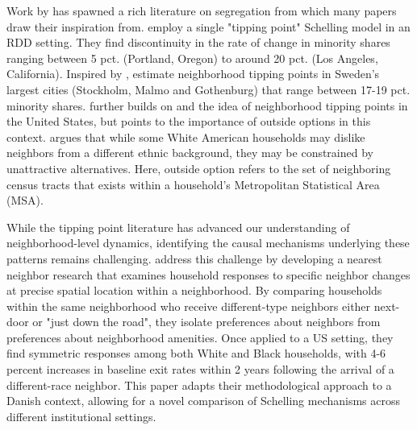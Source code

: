 \documentclass[../main.tex]{subfiles}
\begin{document}
Work by \textcite{schelling1971dynamic} has spawned a rich literature on segregation from which many papers draw their inspiration from. \textcite{card2008tipping} employ a single "tipping point" Schelling model in an RDD setting. They find discontinuity in the rate of change in minority shares ranging between 5 pct. (Portland, Oregon) to around 20 pct. (Los Angeles, California). Inspired by \textcite{card2008tipping}, \textcite{bohlmark_willen_2020_tipping} estimate neighborhood tipping points in Sweden's largest cities (Stockholm, Malmo and Gothenburg) that range between 17-19 pct. minority shares. \textcite{blair2017outside} further builds on \textcite{card2008tipping} and the idea of neighborhood tipping points in the United States, but points to the importance of outside options in this context. \textcite{blair2017outside} argues that while some White American households may dislike neighbors from a different ethnic background, they may be constrained by unattractive alternatives. Here, outside option refers to the set of neighboring census tracts that exists within a household's Metropolitan Statistical Area (MSA). 

While the tipping point literature has advanced our understanding of neighborhood-level dynamics, identifying the causal mechanisms underlying these patterns remains challenging. \textcite{Bayer_2022_nearest_neighbor} address this challenge by developing a nearest neighbor research that examines household responses to specific neighbor changes at precise spatial location within a neighborhood. By comparing households within the same neighborhood who receive different-type neighbors either next-door or "just down the road", they isolate preferences about neighbors from preferences about neighborhood amenities. Once applied to a US setting, they find symmetric responses among both  White and Black households, with 4-6 percent increases in baseline exit rates within 2 years following the arrival of a different-race neighbor. This paper adapts their methodological approach to a Danish context, allowing for a novel comparison of Schelling mechanisms across different institutional settings. 
\end{document}
